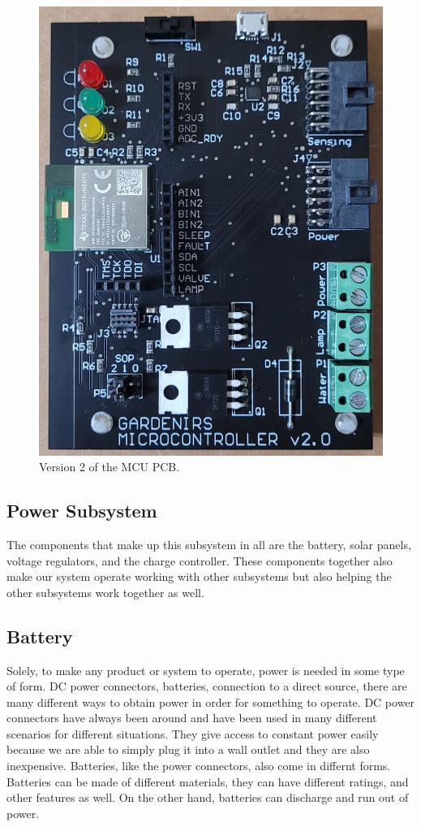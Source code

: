 \documentclass[journal]{IEEEtran}
\begin{document}
\begin{figure}[H]
   \centering
   \label{fig:mcu_pcb_v2}
   \includegraphics[width=\linewidth]{images/mcu_pcb_v2.jpg}
   \caption{Version 2 of the MCU PCB.}
\end{figure}
\subsection{Power Subsystem} \label{sec:power-subsystem}
The components that make up this subsystem in all are the battery, solar panels, voltage regulators, 
and the charge controller. These components together also make our system operate working with other 
subsystems but also helping the other subsystems work together as well. 

\subsection{Battery} \label{sec:battery}
Solely, to make any product or system to operate, power is needed in some type of form. DC power 
connectors, batteries, connection to a direct source, there are many different ways to obtain power 
in order for something to operate. DC power connectors have always been around and have been used 
in many different scenarios for different situations. They give access to constant power easily 
because we are able to simply plug it into a wall outlet and they are also inexpensive. Batteries, 
like the power connectors, also come in differnt forms. Batteries can be made of different materials, 
they can have different ratings, and other features as well. On the other hand, batteries can discharge 
and run out of power. 
\end{document}
